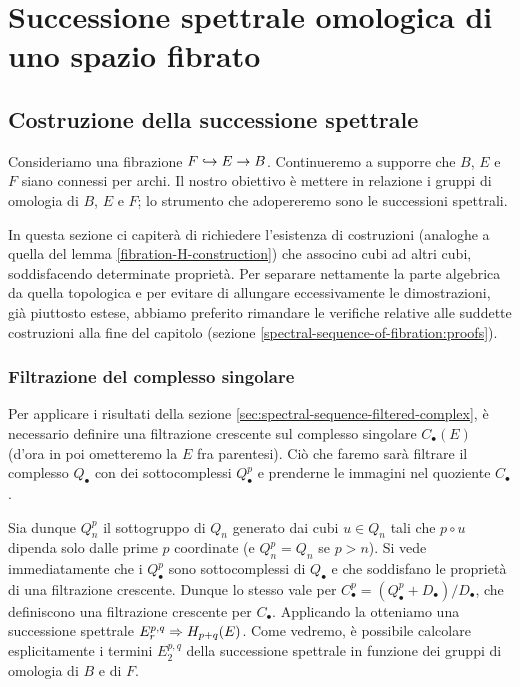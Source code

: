 \chapter{Successione spettrale omologica di uno spazio fibrato}
\label{ch:homological-spectral-sequence-of-fibration}
\section{Costruzione della successione spettrale}
Consideriamo una fibrazione $F\hookrightarrow E\to B$. Continueremo a supporre che $B$, $E$ e $F$ siano connessi per archi. Il nostro obiettivo è mettere in relazione i gruppi di omologia di $B$, $E$ e $F$; lo strumento che adopereremo sono le successioni spettrali.

In questa sezione ci capiterà di richiedere l'esistenza di costruzioni (analoghe a quella del lemma \ref{fibration-H-construction}) che associno cubi ad altri cubi, soddisfacendo determinate proprietà. Per separare nettamente la parte algebrica da quella topologica e per evitare di allungare eccessivamente le dimostrazioni, già piuttosto estese, abbiamo preferito rimandare le verifiche relative alle suddette costruzioni alla fine del capitolo (sezione \ref{spectral-sequence-of-fibration:proofs}).

\subsection{Filtrazione del complesso singolare}
Per applicare i risultati della sezione \ref{sec:spectral-sequence-filtered-complex}, è necessario definire una filtrazione crescente sul complesso singolare $C_\bullet(E)$ (d'ora in poi ometteremo la $E$ fra parentesi). Ciò che faremo sarà filtrare il complesso $Q_\bullet$ con dei sottocomplessi $Q^p_\bullet$ e prenderne le immagini nel quoziente $C_\bullet$.

Sia dunque $Q^p_n$ il sottogruppo di $Q_n$ generato dai cubi $u\in Q_n$ tali che $p\circ u$ dipenda solo dalle prime $p$ coordinate (e $Q^p_n=Q_n$ se $p>n$). Si vede immediatamente che i $Q^p_\bullet$ sono sottocomplessi di $Q_\bullet$ e che soddisfano le proprietà di una filtrazione crescente. Dunque lo stesso vale per $C^p_\bullet=(Q^p_\bullet+D_\bullet)/D_\bullet$, che definiscono una filtrazione crescente per $C_\bullet$. Applicando la  otteniamo una successione spettrale $E^{p,q}_r\Rightarrow H_{p+q}(E)$. Come vedremo, è possibile calcolare esplicitamente i termini $E^{p,q}_2$ della successione spettrale in funzione dei gruppi di omologia di $B$ e di $F$.

